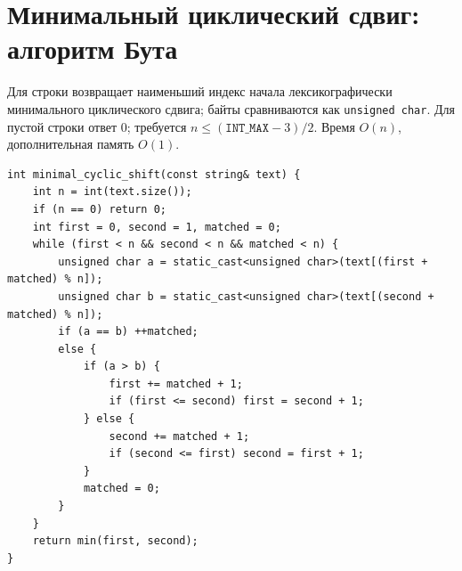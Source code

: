 %

\fi
\section{Минимальный циклический сдвиг: алгоритм Бута}
Для строки возвращает наименьший индекс начала лексикографически минимального циклического сдвига; байты сравниваются как \texttt{unsigned char}.
Для пустой строки ответ 0; требуется $n\le(\texttt{INT\_MAX}-3)/2$.
Время $O(n)$, дополнительная память $O(1)$.
\begin{lstlisting}[name=extra_string_booth]
int minimal_cyclic_shift(const string& text) {
    int n = int(text.size());
    if (n == 0) return 0;
    int first = 0, second = 1, matched = 0;
    while (first < n && second < n && matched < n) {
        unsigned char a = static_cast<unsigned char>(text[(first + matched) % n]);
        unsigned char b = static_cast<unsigned char>(text[(second + matched) % n]);
        if (a == b) ++matched;
        else {
            if (a > b) {
                first += matched + 1;
                if (first <= second) first = second + 1;
            } else {
                second += matched + 1;
                if (second <= first) second = first + 1;
            }
            matched = 0;
        }
    }
    return min(first, second);
}
\end{lstlisting}
%

\iffalse

